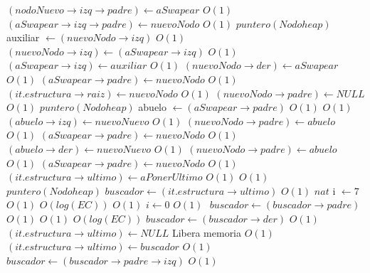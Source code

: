 \begin{Algoritmos}
\begin{algorithmic}[1]
								\Else
									\State $(nodoNuevo \rightarrow izq \rightarrow padre) \gets aSwapear$ \Comment $O(1)$
									\State $(aSwapear \rightarrow izq \rightarrow padre) \gets nuevoNodo$ \Comment $O(1)$
									\State $puntero(Nodoheap)$ auxiliar $\gets (nuevoNodo \rightarrow izq)$ \Comment $O(1)$
									\State $(nuevoNodo \rightarrow izq) \gets (aSwapear \rightarrow izq)$ \Comment $O(1)$
									\State $(aSwapear \rightarrow izq) \gets auxiliar$ \Comment $O(1)$
								\EndIf
							\EndIf
						\State $(nuevoNodo \rightarrow der) \gets aSwapear$ \Comment $O(1)$
					\EndIf	
					\State $(aSwapear \rightarrow padre) \gets nuevoNodo$ \Comment $O(1)$
					\State $(it.estructura \rightarrow raiz) \gets nuevoNodo$	 \Comment $O(1)$
					\State $(nuevoNodo \rightarrow padre) \gets NULL$			 \Comment $O(1)$
					\Else
					\State $puntero(Nodoheap)$ abuelo $\gets (aSwapear \rightarrow padre)$ \Comment $O(1)$
						 \Comment $O(1)$
							\State $(abuelo \rightarrow izq) \gets nuevoNuevo$ \Comment $O(1)$
							\State $(nuevoNodo \rightarrow padre) \gets abuelo$ \Comment $O(1)$
							\State $(aSwapear \rightarrow padre) \gets nuevoNodo$ \Comment $O(1)$
						\Else
							\State $(abuelo \rightarrow der) \gets nuevoNuevo$ \Comment $O(1)$
							\State $(nuevoNodo \rightarrow padre) \gets abuelo$ \Comment $O(1)$
							\State $(aSwapear \rightarrow padre) \gets nuevoNodo$ \Comment $O(1)$
						\EndIf
					\EndIf
	\EndIf	
	\State $(it.estructura \rightarrow ultimo) \gets aPonerUltimo$	\Comment $O(1)$
				 \Comment $O(1)$
					\State $puntero(Nodoheap)$ $buscador \gets (it.estructura \rightarrow ultimo)$ \Comment $O(1)$
					\State $nat$ i $\gets 7$ \Comment $O(1)$
					 \Comment $O(log(EC))$
						 \Comment $O(1)$
							\State $i \gets 0$ \Comment $O(1)$
						\Else$ $ $buscador \gets (buscador \rightarrow padre)$ \Comment $O(1)$
						\EndIf
					\EndWhile
					 \Comment $O(1)$
						 \Comment $O(log(EC))$
							\State $buscador \gets (buscador \rightarrow der)$ \Comment $O(1)$
						\EndWhile
						\State $(it.estructura \rightarrow ultimo) \gets NULL$ \Comment Libera memoria $O(1)$						
						\State $(it.estructura \rightarrow ultimo) \gets buscador$ \Comment $O(1)$
					\Else $buscador \gets (buscador \rightarrow padre \rightarrow izq)$ \Comment $O(1)$

\end{algorithmic}
\end{Algoritmos}
